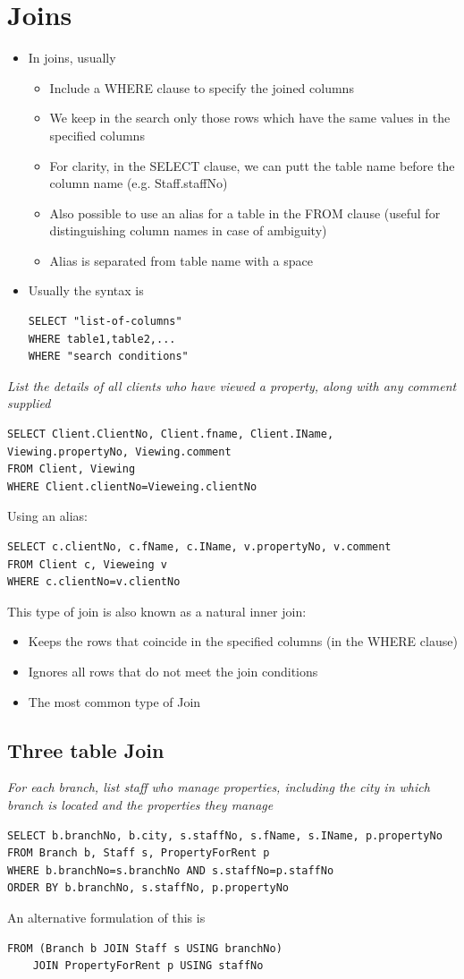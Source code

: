 \documentclass{article}[18pt]
\begin{document}
\section{Joins}
\begin{itemize}
	\item In joins, usually
	\begin{itemize}
		\item Include a WHERE clause to specify the joined columns
		\item We keep in the search only those rows which have the same values in the specified columns
		\item For clarity, in the SELECT clause, we can putt the table name before the column name (e.g. Staff.staffNo)
		\item Also possible to use an alias for a table in the FROM clause (useful for distinguishing column names in case of ambiguity)
		\item Alias is separated from table name with a space
	\end{itemize}
	\item Usually the syntax is
\begin{verbatim}
SELECT "list-of-columns"
WHERE table1,table2,...
WHERE "search conditions"
\end{verbatim}
\end{itemize}
\textit{List the details of all clients who have viewed a property, along with any comment supplied}
\begin{verbatim}
SELECT Client.ClientNo, Client.fname, Client.IName, Viewing.propertyNo, Viewing.comment
FROM Client, Viewing
WHERE Client.clientNo=Vieweing.clientNo
\end{verbatim}
Using an alias:
\begin{verbatim}
SELECT c.clientNo, c.fName, c.IName, v.propertyNo, v.comment
FROM Client c, Vieweing v
WHERE c.clientNo=v.clientNo
\end{verbatim}
This type of join is also known as a natural inner join:
\begin{itemize}
	\item Keeps the rows that coincide in the specified columns (in the WHERE clause)
	\item Ignores all rows that do not meet the join conditions
	\item The most common type of Join
\end{itemize}
\subsection{Three table Join}
\textit{For each branch, list staff who manage properties, including the city in which branch is located and the properties they manage}
\begin{verbatim}
SELECT b.branchNo, b.city, s.staffNo, s.fName, s.IName, p.propertyNo
FROM Branch b, Staff s, PropertyForRent p
WHERE b.branchNo=s.branchNo AND s.staffNo=p.staffNo
ORDER BY b.branchNo, s.staffNo, p.propertyNo
\end{verbatim}
An alternative formulation of this is
\begin{verbatim}
FROM (Branch b JOIN Staff s USING branchNo)
	JOIN PropertyForRent p USING staffNo
\end{verbatim}
\end{document}
